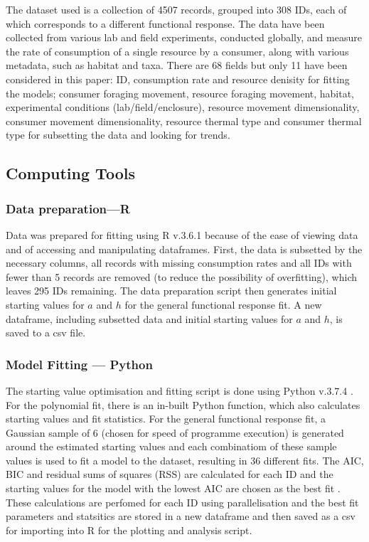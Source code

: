 \documentclass[11pt, a4paper, titlepage]{article}
\begin{document}
The dataset used is a collection of 4507 records, grouped into 308 IDs, each of which corresponds to a different functional response. The data have been collected from various lab and field experiments, conducted globally, and measure the rate of consumption of a single resource by a consumer, along with various metadata, such as habitat and taxa. There are 68 fields but only 11 have been considered in this paper: ID, consumption rate and resource denisity for fitting the models; consumer foraging movement, resource foraging movement, habitat, experimental conditions (lab/field/enclosure), resource movement dimensionality, consumer movement dimensionality, resource thermal type and consumer thermal type for subsetting the data and looking for trends.

\subsection{Computing Tools}

\subsubsection{Data preparation—R}

Data was prepared for fitting using R v.3.6.1 \parencite{R} because of the ease of viewing data and of accessing and manipulating dataframes. First, the data is subsetted by the necessary columns, all records with missing consumption rates and all IDs with fewer than 5 records are removed (to reduce the possibility of overfitting), which leaves 295 IDs remaining. The data preparation script then generates initial starting values for $a$ and $h$ for the general functional response fit. A new dataframe, including subsetted data and initial starting values for $a$ and $h$, is saved to a csv file.

\subsubsection{Model Fitting — Python}
The starting value optimisation and fitting script is done using Python v.3.7.4 \parencite{Python}. For the polynomial fit, there is an in-built Python function, which also calculates starting values and fit statistics. For the general functional response fit, a Gaussian sample of 6 (chosen for speed of programme execution) is generated around the estimated starting values and each combinatiom of these sample values is used to fit a model to the dataset, resulting in 36 different fits. The AIC, BIC and residual sums of squares (RSS) are calculated for each ID and the starting values for the model with the lowest AIC are chosen as the best fit \parencite{Johnson2004}.  These calculations are perfomed for each ID using parallelisation and the best fit parameters and statsitics are stored in a new dataframe and then saved as a csv for importing into R for the plotting and analysis script.
\end{document}
